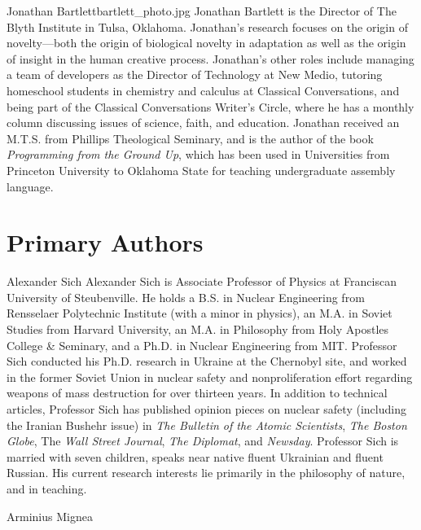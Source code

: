 \begin{authorbio}{Jonathan Bartlett}{bartlett_photo.jpg}
Jonathan Bartlett is the Director of The Blyth Institute in Tulsa, Oklahoma.  Jonathan's research focuses on the origin of novelty---both the origin of biological novelty in adaptation as well as the origin of insight in the human creative process.  Jonathan's other roles include managing a team of developers as the Director of Technology at New Medio, tutoring homeschool students in chemistry and calculus at Classical Conversations, and being part of the Classical Conversations Writer's Circle, where he has a monthly column discussing issues of science, faith, and education.  Jonathan received an M.T.S. from Phillips Theological Seminary, and is the author of the book \textit{Programming from the Ground Up}, which has been used in Universities from Princeton University to Oklahoma State for teaching undergraduate assembly language.
\end{authorbio}

\section*{Primary Authors}

\begin{authorbio}{Alexander Sich}{}
Alexander Sich is Associate Professor of Physics at Franciscan University of Steubenville. He holds a B.S. in Nuclear Engineering from Rensselaer Polytechnic Institute (with a minor in physics), an M.A. in Soviet Studies from Harvard University, an M.A. in Philosophy from Holy Apostles College \& Seminary, and a Ph.D. in Nuclear Engineering from MIT. Professor Sich conducted his Ph.D. research in Ukraine at the Chernobyl site, and worked in the former Soviet Union in nuclear safety and nonproliferation effort regarding weapons of mass destruction for over thirteen years. In addition to technical articles, Professor Sich has published opinion pieces on nuclear safety (including the Iranian Bushehr issue) in \emph{The Bulletin of the Atomic Scientists}, \emph{The Boston Globe}, The \emph{Wall Street Journal}, \emph{The Diplomat}, and \emph{Newsday}. Professor Sich is married with seven children, speaks near native fluent Ukrainian and fluent Russian. His current research interests lie primarily in the philosophy of nature, and in teaching.
\end{authorbio}

\begin{authorbio}{Arminius Mignea}{}

\end{authorbio}

